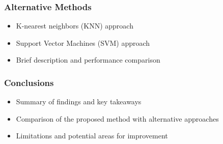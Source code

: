 \documentclass[8pt]{beamer}
\begin{document}
\begin{frame}
\frametitle{Alternative Methods}

\begin{itemize}
\item K-nearest neighbors (KNN) approach
\item Support Vector Machines (SVM) approach
\item Brief description and performance comparison
\end{itemize}

\end{frame}

\begin{frame}
\frametitle{Conclusions}

\begin{itemize}
\item Summary of findings and key takeaways
\item Comparison of the proposed method with alternative approaches
\item Limitations and potential areas for improvement
\end{itemize}

\end{frame}


\printbibliography
\end{document}
